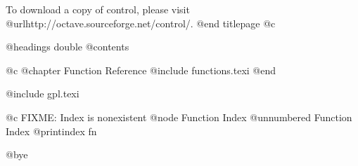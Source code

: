 To download a copy of control, please visit
@url{http://octave.sourceforge.net/control/}.
@end titlepage
@c %

@headings double
@contents

@c @chapter Function Reference
@include functions.texi
@end

@include gpl.texi

@c FIXME: Index is nonexistent
@node Function Index
@unnumbered Function Index
@printindex fn

@bye
